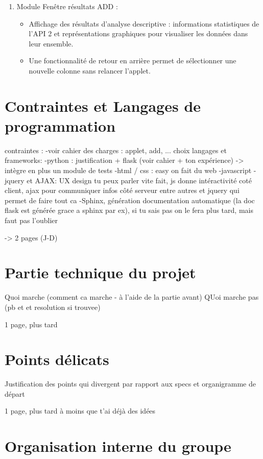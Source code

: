 \begin{description}[style=unboxed,leftmargin=0.2cm]
\begin{enumerate}
					\item Module Fenêtre résultats ADD :
						\begin{itemize}
						\item Affichage des résultats d'analyse descriptive : informations statistiques de l'API 2 et représentations graphiques pour visualiser les données dans leur ensemble.
						\item Une fonctionnalité de retour en arrière permet de sélectionner une nouvelle colonne sans relancer l'applet.
						\end{itemize}
					\end{enumerate}
				
			\end{description}
		
	\section{Contraintes et Langages de programmation}
		contraintes :
			-voir cahier des charges : applet, add, ...
		choix langages et frameworks:
			-python : justification + flask (voir cahier + ton expérience) -> intègre en plus un module de tests
			-html / css : easy on fait du web
			-javascript - jquery et AJAX: UX design tu peux parler vite fait, js donne intéractivité coté client, ajax pour communiquer infos côté serveur entre autres et jquery qui permet de faire tout ca
			-Sphinx, génération documentation automatique (la doc flask est générée grace a sphinx par ex), si tu sais pas on le fera plus tard, mais faut pas l'oublier
			
		-> 2 pages (J-D)
		
	\section{Partie technique du projet}
		Quoi marche (comment ca marche - à l'aide de la partie avant)
		QUoi marche pas (pb et et resolution si trouvee)
		
		1 page, plus tard
		
	\section{Points délicats}
		
		Justification des points qui divergent par rapport aux specs et organigramme de départ
		
		1 page, plus tard à moins que t'ai déjà des idées
				
	\section{Organisation interne du groupe}
		

